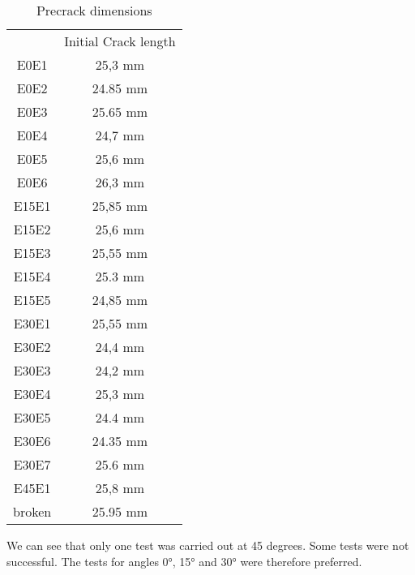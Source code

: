 \begin{table}[h]
	\centering
	\begin{tabular}{c c }
		\multicolumn{1}{l}{} & \multicolumn{1}{l}{Initial Crack length} \\
		\multicolumn{1}{c}{\cellcolor[HTML]{F8CBAD}E0E1} & 25,3   mm \\
		\multicolumn{1}{c}{\cellcolor[HTML]{F8CBAD}E0E2} & 24.85 mm \\
		\multicolumn{1}{c}{\cellcolor[HTML]{F8CBAD}E0E3} & 25.65 mm \\
		\multicolumn{1}{c}{\cellcolor[HTML]{F8CBAD}E0E4} & 24,7 mm \\ 
		\cellcolor[HTML]{F8CBAD}E0E5 & 25,6 mm \\ 
		\cellcolor[HTML]{F8CBAD}E0E6 & 26,3 mm \\ 
		\multicolumn{1}{c}{\cellcolor[HTML]{C65911}E15E1} & 25,85 mm \\ 
		\multicolumn{1}{c}{\cellcolor[HTML]{C65911}E15E2} & 25,6 mm \\ 
		\multicolumn{1}{c}{\cellcolor[HTML]{C65911}E15E3} & 25,55 mm \\ 
		\multicolumn{1}{c}{\cellcolor[HTML]{C65911}E15E4} & 25.3 mm \\
		\multicolumn{1}{c}{\cellcolor[HTML]{C65911}E15E5} & 24,85 mm \\ 
		\multicolumn{1}{c}{\cellcolor[HTML]{BF8F00}E30E1} & 25,55 mm \\ 
		\multicolumn{1}{c}{\cellcolor[HTML]{BF8F00}E30E2} & 24,4 mm \\ 
		\multicolumn{1}{c}{\cellcolor[HTML]{BF8F00}E30E3} & 24,2 mm \\ 
		\multicolumn{1}{c}{\cellcolor[HTML]{BF8F00}E30E4} & 25,3 mm \\ 
		\multicolumn{1}{c}{\cellcolor[HTML]{BF8F00}E30E5} & 24.4 mm \\ 
		\multicolumn{1}{c}{\cellcolor[HTML]{BF8F00}E30E6} & 24.35 mm \\ 
		\multicolumn{1}{c}{\cellcolor[HTML]{BF8F00}E30E7} & 25.6 mm \\
		\multicolumn{1}{c}{\cellcolor[HTML]{FFA500}E45E1} & 25,8 mm \\ 
		\multicolumn{1}{c}{\cellcolor[HTML]{00FF00}broken} & 25.95 mm \\  
	\end{tabular}
	\caption{Precrack dimensions}
	\label{tab:Tab11}
\end{table}

We can see that only one test was carried out at 45 degrees. Some tests were not successful. The tests for angles 0°, 15° and 30° were therefore preferred.

